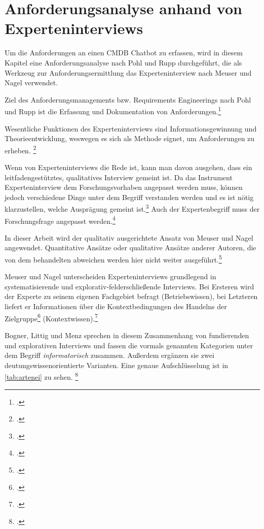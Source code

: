 \chapter{Anforderungsanalyse anhand von Experteninterviews} \label{AnfA}
Um die Anforderungen an einen \acs{CMDB} Chatbot zu erfassen, wird in diesem Kapitel eine Anforderungsanalyse nach Pohl und Rupp durchgeführt, die als Werkzeug zur Anforderungsermittlung das Experteninterview nach Meuser und Nagel verwendet.

Ziel des Anforderungsmanagements bzw. Requirements Engineerings nach Pohl und Rupp ist die Erfassung und Dokumentation von Anforderungen.\footcite[Vgl.][3]{Pohl_2015_Requirements}

Wesentliche Funktionen des Experteninterviews sind Informationsgewinnung und Theorieentwicklung, weswegen es sich als Methode eignet, um Anforderungen zu erheben.
\footcites[Vgl.][9]{Bogner_2014_Interview}[Vgl.][187\psq]{Glaeser_2010_Inhaltsanalyse}

Wenn von Experteninterviews die Rede ist, kann man davon ausgehen, dass ein leitfadengestütztes, qualitatives Interview gemeint ist. Da das Instrument Experteninterview dem Forschungsvorhaben angepasst werden muss, können jedoch verschiedene Dinge unter dem Begriff verstanden werden und es ist nötig klarzustellen, welche Ausprägung gemeint ist.\footcite[Vgl.][3]{Bogner_2014_Interview}
Auch der Expertenbegriff muss der Forschungsfrage angepasst werden.\footcite[Vgl.][180]{Meuser_1994_Interview}

In dieser Arbeit wird der qualitativ ausgerichtete Ansatz von Meuser und Nagel angewendet. Quantitative Ansätze oder qualitative Ansätze anderer Autoren, die von dem behandelten abweichen werden hier nicht weiter ausgeführt.\footcite[Vgl.][o. \pno]{Meuser_2010_Interview}

Meuser und Nagel unterscheiden Experteninterviews grundlegend in systematisierende und explorativ-felderschließende Interviews. Bei Ersteren wird der Experte zu seinem eigenen Fachgebiet befragt (Betriebswissen), bei Letzteren liefert er \glqq{}Informationen über die Kontextbedingungen des Handelns der Zielgruppe\grqq\footcite[][445]{Meuser_1991_Interview} (Kontextwissen).\footcite[Vgl.][445]{Meuser_1991_Interview}

Bogner, Littig und Menz sprechen in diesem Zusammenhang von fundierenden und explorativen Interviews und fassen die vormals genannten Kategorien unter dem Begriff \textit{informatorisch} zusammen. Außerdem ergänzen sie zwei  deutungswissenorientierte Varianten. Eine genaue Aufschlüsselung ist in \autoref{tab:artenei} zu sehen.
\footcites[Vgl.][22\psqq]{Bogner_2014_Interview}[Vgl.][445\psq]{Meuser_1991_Interview}



